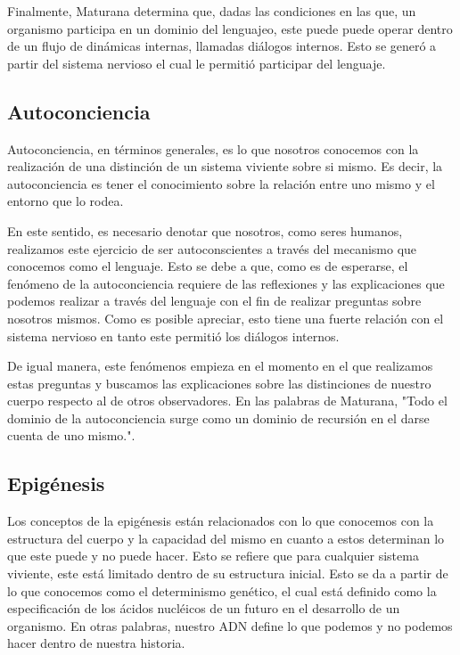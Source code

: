\documentclass[10pt]{article}
\begin{document}
        Finalmente, Maturana determina que, dadas las condiciones en las que, un organismo participa en un dominio del lenguajeo, este puede puede operar dentro de un flujo de dinámicas internas, llamadas diálogos internos. Esto se generó a partir del sistema nervioso el cual le permitió participar del lenguaje. 

        \subsection{Autoconciencia}

        Autoconciencia, en términos generales, es lo que nosotros conocemos con la realización de una distinción de un sistema viviente sobre si mismo. Es decir, la autoconciencia es tener el conocimiento sobre la relación entre uno mismo y el entorno que lo rodea. 

        En este sentido, es necesario denotar que nosotros, como seres humanos, realizamos este ejercicio de ser autoconscientes a través del mecanismo que conocemos como el lenguaje. Esto se debe a que, como es de esperarse, el fenómeno de la autoconciencia requiere de las reflexiones y las explicaciones que podemos realizar a través del lenguaje con el fin de realizar preguntas sobre nosotros mismos. Como es posible apreciar, esto tiene una fuerte relación con el sistema nervioso en tanto este permitió los diálogos internos.
        
        De igual manera, este fenómenos empieza en el momento en el que realizamos estas preguntas y buscamos las explicaciones sobre las distinciones de nuestro cuerpo respecto al de otros observadores. En las palabras de Maturana, "Todo el dominio de la autoconciencia surge como un dominio de recursión en el darse cuenta de uno mismo.".

        \subsection{Epigénesis}

        Los conceptos de la epigénesis están relacionados con lo que conocemos con la estructura del cuerpo y la capacidad del mismo en cuanto a estos determinan lo que este puede y no puede hacer.  Esto se refiere que para cualquier sistema viviente, este está limitado dentro de su estructura inicial. Esto se da a partir de lo que conocemos como el determinismo genético, el cual está definido como la especificación de los ácidos nucléicos de un futuro en el desarrollo de un organismo. En otras palabras, nuestro ADN define lo que podemos y no podemos hacer dentro de nuestra historia.
\end{document}
